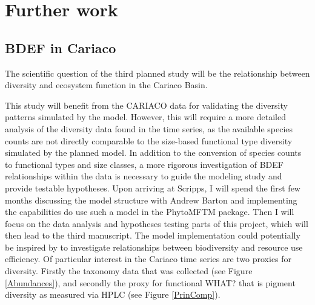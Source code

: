 \chapter {Further work}


\section{BDEF in Cariaco}

The scientific question of the third planned study will be the relationship between diversity and ecosystem function in the Cariaco Basin. 

This study will benefit from the CARIACO data for validating the diversity patterns simulated by the model. However, this will require a more detailed analysis of the diversity data found in the time series, as the available species counts are not directly comparable to the size-based functional type diversity simulated by the planned model. 
In addition to the conversion of species counts to functional types and size classes,
 a more rigorous investigation of BDEF relationships within the data is necessary to guide the modeling study and provide testable hypotheses. Upon arriving at Scripps, I will spend the first few months discussing the model structure with Andrew Barton and implementing the capabilities do use such a model in the PhytoMFTM package. Then I will focus on the data analysis and hypotheses testing parts of this project, which will then lead to the third manuscript. The model implementation could potentially be inspired by \citet{Loreau1998b} to investigate relationships between biodiversity and resource use efficiency.
  Of particular interest in the Cariaco time series are two proxies for diversity. Firstly the taxonomy data that was collected (see Figure \ref{Abundances}),
   and secondly the proxy for functional WHAT? that is pigment diversity as measured via HPLC (see Figure \ref{PrinComp}). %
   
   
   
   
